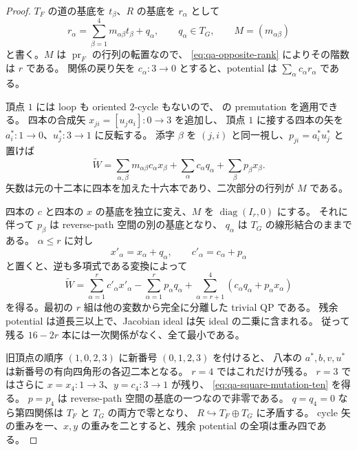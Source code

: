 \begin{proof}
$T_F$ の道の基底を $t_\beta$、$R$ の基底を $r_\alpha$ として
\[
 r_\alpha=\sum_{\beta=1}^4m_{\alpha\beta}t_\beta+q_\alpha,
 \qquad q_\alpha\in T_G,\qquad M=(m_{\alpha\beta})
\]
と書く。$M$ は $\operatorname{pr}_F$ の行列の転置なので、
\eqref{eq:qa-opposite-rank} によりその階数は $r$ である。
関係の戻り矢を $c_\alpha:3\to0$ とすると、potential は
$\sum_\alpha c_\alpha r_\alpha$ である。

頂点 $1$ には loop も oriented $2$-cycle もないので、
\cite[Section 5]{DWZ2008} の premutation を適用できる。
四本の合成矢 $x_{ji}=[u_ja_i]:0\to3$ を追加し、
頂点 $1$ に接する四本の矢を
$a_i^*:1\to0$、$u_j^*:3\to1$ に反転する。
添字 $\beta$ を $(j,i)$ と同一視し、$p_{ji}=a_i^*u_j^*$ と置けば
\begin{equation}
 \widetilde W
 =\sum_{\alpha,\beta}m_{\alpha\beta}c_\alpha x_\beta
   +\sum_\alpha c_\alpha q_\alpha+\sum_\beta p_\beta x_\beta.
 \label{eq:qa-square-premutation}
\end{equation}
矢数は元の十二本に四本を加えた十六本であり、二次部分の行列が $M$ である。

四本の $c$ と四本の $x$ の基底を独立に変え、$M$ を
$\operatorname{diag}(I_r,0)$ にする。
それに伴って $p_\beta$ は reverse-path 空間の別の基底となり、
$q_\alpha$ は $T_G$ の線形結合のままである。
$\alpha\le r$ に対し
\[
 x'_\alpha=x_\alpha+q_\alpha,\qquad
 c'_\alpha=c_\alpha+p_\alpha
\]
と置くと、逆も多項式である変換によって
\begin{equation}
 \widetilde W
 =\sum_{\alpha=1}^rc'_\alpha x'_\alpha
  -\sum_{\alpha=1}^rp_\alpha q_\alpha
  +\sum_{\alpha=r+1}^4(c_\alpha q_\alpha+p_\alpha x_\alpha)
 \label{eq:qa-square-explicit-splitting}
\end{equation}
を得る。最初の $r$ 組は他の変数から完全に分離した trivial QP である。
残余 potential は道長三以上で、Jacobian ideal は矢 ideal の二乗に含まれる。
従って残る $16-2r$ 本には一次関係がなく、全て最小である。

旧頂点の順序 $(1,0,2,3)$ に新番号 $(0,1,2,3)$ を付けると、
八本の $a^*,b,v,u^*$ は新番号の有向四角形の各辺二本となる。
$r=4$ ではこれだけが残る。
$r=3$ ではさらに $x=x_4:1\to3$、$y=c_4:3\to1$ が残り、
\eqref{eq:qa-square-mutation-ten} を得る。
$p=p_4$ は reverse-path 空間の基底の一つなので非零である。
$q=q_4=0$ なら第四関係は $T_F$ と $T_G$ の両方で零となり、
$R\hookrightarrow T_F\oplus T_G$ に矛盾する。
cycle 矢の重みを一、$x,y$ の重みを二とすると、残余 potential の全項は重み四である。
\end{proof}

